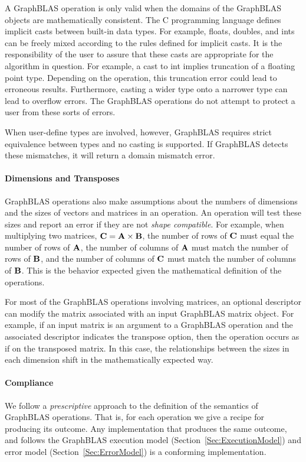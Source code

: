A GraphBLAS operation is only valid when the domains of the GraphBLAS objects are
mathematically consistent.  The C programming language defines implicit casts 
between built-in data types.  For example, {\sf float}s, {\sf double}s, and {\sf int}s can be 
freely mixed according to the rules defined for implicit casts.  It is the 
responsibility of the user to assure that these casts are appropriate for the 
algorithm in question.  For example, a cast to {\sf int} implies truncation of a floating 
point type.  Depending on the operation, this truncation error could lead to
erroneous results.  Furthermore, casting a wider type onto a narrower type can lead 
to overflow errors.  The GraphBLAS operations do not attempt to protect a user from 
these sorts of errors.

When user-define types are involved, however, GraphBLAS requires strict equivalence
between types and no casting is supported.  If GraphBLAS detects these mismatches,
it will return a domain mismatch error.

\paragraph{Dimensions and Transposes}

GraphBLAS operations also make assumptions about the numbers of dimensions and 
the sizes of vectors and matrices in an operation.   An operation will test these 
sizes and report an error if they are not \emph{shape compatible}.  For example, when multiplying 
two matrices, ${\bf C} = {\bf A} \times {\bf B}$, the number of rows of 
${\bf C}$ must equal the number of rows of ${\bf A}$, the number of columns 
of ${\bf A}$ must match the number of rows of ${\bf B}$, and the number of 
columns of ${\bf C}$ must match the number of columns of ${\bf B}$.  This 
is the behavior expected given the mathematical definition of the operations.   

For most of the GraphBLAS operations involving matrices, an optional descriptor 
can modify the matrix associated with an input GraphBLAS matrix object.  For 
example, if an input matrix is an argument to a GraphBLAS operation and the 
associated descriptor indicates the transpose option, then the operation occurs 
as if on the transposed matrix.  In this case, the relationships between the 
sizes in each dimension shift in the mathematically expected way. 


\paragraph{Compliance}

We follow a \emph{prescriptive} approach to the definition of the semantics
of GraphBLAS operations. That is, for each operation we give a recipe for
producing its outcome.
Any implementation that produces the same outcome,
and follows the GraphBLAS execution model (Section~\ref{Sec:ExecutionModel}) and
error model (Section~\ref{Sec:ErrorModel}) is a conforming implementation.
